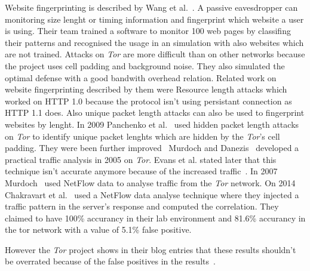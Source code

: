 \documentclass{sig-alternate}
\begin{document}
Website fingerprinting is described by Wang et al.~\cite{wangeffective}. A passive eavesdropper can monitoring size lenght or timing information and fingerprint which website a user is using. Their team trained a software to monitor 100 web pages by classifing their patterns and recognised the usage in an simulation with also websites which are not trained. Attacks on \textit{Tor} are more difficult than on other networks because the project uses cell padding and background noise. They also simulated the optimal defense with a good bandwith overhead relation.
Related work on website fingerprinting described by them were Resource length attacks which worked on HTTP 1.0 because the protocol isn't using persistant connection as HTTP 1.1 does. Also unique packet length attacks can also be used to fingerprint websites by lenght. In 2009 Panchenko et al.~\cite{panchenko2011website} used hidden packet length attacks on \textit{Tor} to identify unique packet lenghts which are hidden by the \textit{Tor}'s cell padding. They were been further improved~\cite{dyer2012peek, cai2012touching, wang2013improved} Murdoch and Danezis~\cite{murdoch2005low} developed a practical traffic analysis in 2005 on \textit{Tor}. Evans et al. stated later that this technique isn't accurate anymore because of the increased traffic~\cite{evans2009practical}. In 2007 Murdoch~\cite{murdoch2007sampled} 
used NetFlow data to analyse traffic from the \textit{Tor} network. On 2014 Chakravart et al.~\cite{chakravarty2014effectiveness} used a NetFlow data analyse technique where they injected a traffic pattern in the server's response and computed the correlation. They claimed to have 100\% accurancy in their lab environment and 81.6\% accurancy in the tor network with a value of 5.1\% false positive.

However the \textit{Tor} project shows in their blog entries that these results shouldn't be overrated because of the false positives in the results~\cite{one, two}.
\newpage
\end{document}
